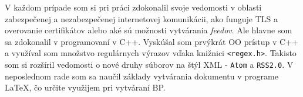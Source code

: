 \documentclass[a4paper, 11pt]{article}
\begin{document}
    V každom prípade som si pri práci zdokonalil svoje vedomosti v oblasti zabezpečenej a nezabezpečenej internetovej komunikácii, ako funguje TLS a overovanie certifikátov alebo aké sú možnosti vytvárania \textit{feedov}. Ale hlavne som sa zdokonalil v programovaní v C++. Vyskúšal som prvýkrát OO prístup v C++ a využíval som množstvo regulárnych výrazov vďaka knižnici \texttt{<regex.h>}. Takisto som si rozšíril vedomosti o nové druhy súborov na štýl XML - \texttt{Atom} a \texttt{RSS2.0}. V neposlednom rade som sa naučil základy vytvárania dokumentu v programe \LaTeX, čo určite využijem pri vytváraní BP.

    \clearpage
    \renewcommand{\refname}{Zdroje}
    
    
 
\end{document}
